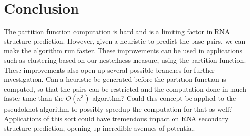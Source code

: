 \section{Conclusion}

The partition function computation is hard and is a limiting factor in
RNA structure prediction. However, given a heuristic to predict the
base pairs, we can make the algorithm run faster. These improvements
can be used in applications such as clustering based on our nestedness
measure, using the partition function. These improvements also open up
several possible branches for further investigation. Can a heuristic
be generated before the partition function is computed, so that the
pairs can be restricted and the computation done in much faster time
than the $O(n^3)$ algorithm? Could this concept be applied to the
pseudoknot algorithm to possibly speedup the computation for that as
well? Applications of this sort could have tremendous impact on RNA
secondary structure prediction, opening up incredible avenues of
potential.

